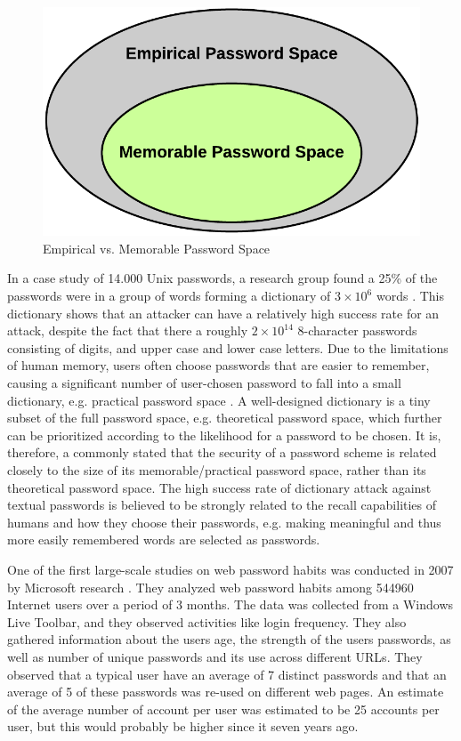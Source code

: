  \begin{figure}[H]
      \centering
      \includegraphics[scale=0.25]{pics/review/EmpiricalVsPractical.png}
      \caption{Empirical vs. Memorable Password Space}
      \label{fig:memorable}
    \end{figure}

  In a case study of 14.000 Unix passwords, a research group found a 25\% of the passwords were in a group of words forming a dictionary of $3\times10^{6}$ words \cite{UnixPasswords}. This dictionary shows that an attacker can have a relatively high success rate for an attack, despite the fact that there a roughly $2\times10^{14}$ 8-character passwords consisting of digits, and upper case and lower case letters. Due to the limitations of human memory, users often choose passwords that are easier to remember, causing a significant number of user-chosen password to fall into a small dictionary, e.g. practical password space \cite{Tao}. A well-designed dictionary is a tiny subset of the full password space, e.g. theoretical password space, which further can be prioritized according to the likelihood for a password to be chosen. It is, therefore, a commonly stated that the security of a password scheme is related closely to the size of its memorable/practical password space, rather than its theoretical password space. The high success rate of dictionary attack against textual passwords is believed to be strongly related to the recall capabilities of humans and how they choose their passwords, e.g. making meaningful and thus more easily remembered words are selected as passwords.

  One of the first large-scale studies on web password habits was conducted in 2007 by Microsoft research \cite{habits1}. They analyzed web password habits among 544960 Internet users over a period of 3 months. The data was collected from a Windows Live Toolbar, and they observed activities like login frequency. They also gathered information about the users age, the strength of the users passwords, as well as number of unique passwords and its use across different URLs. They observed that a typical user have an average of 7 distinct passwords and that an average of 5 of these passwords was re-used on different web pages. An estimate of the average number of account per user was estimated to be 25 accounts per user, but this would probably be higher since it seven years ago.

